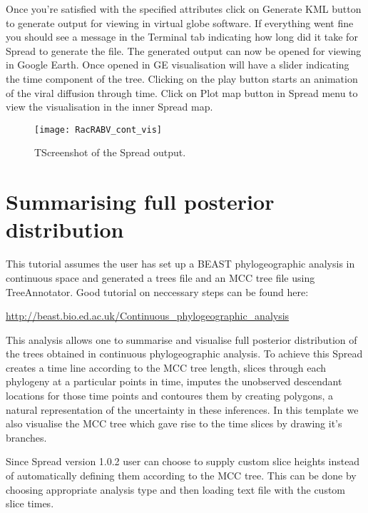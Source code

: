 Once you're satisfied with the specified attributes click on Generate
KML button to generate output for viewing in virtual globe software.
If everything went fine you should see a message in the Terminal tab
indicating how long did it take for Spread to generate the file. The
generated output can now be opened for viewing in Google Earth. Once
opened in GE visualisation will have a slider indicating the time
component of the tree. Clicking on the play button starts an animation
of the viral diffusion through time. Click on Plot map button in Spread
menu to view the visualisation in the inner Spread map.

\begin{figure}[H]
\begin{centering}
\texttt{[image: RacRABV\_cont\_vis]}
\caption{TScreenshot of the Spread output.}
\label{fig:RacRABV_cont_vis}
\par\end{centering}
\end{figure}

\section{Summarising full posterior distribution}

This tutorial assumes the user has set up a BEAST phylogeographic
analysis in continuous space and generated a trees file and an MCC
tree file using TreeAnnotator. Good tutorial on neccessary steps can
be found here:

\url{http://beast.bio.ed.ac.uk/Continuous_phylogeographic_analysis}

\noindent
This analysis allows one to summarise and visualise full posterior
distribution of the trees obtained in continuous phylogeographic analysis.
To achieve this Spread creates a time line according to the MCC tree
length, slices through each phylogeny at a particular points in time,
imputes the unobserved descendant locations for those time points
and contoures them by creating polygons, a natural representation
of the uncertainty in these inferences. In this template we also visualise
the MCC tree which gave rise to the time slices by drawing it's branches.

Since Spread version 1.0.2 user can choose to supply custom slice
heights instead of automatically defining them according to the MCC
tree. This can be done by choosing appropriate analysis type and then
loading text file with the custom slice times.

